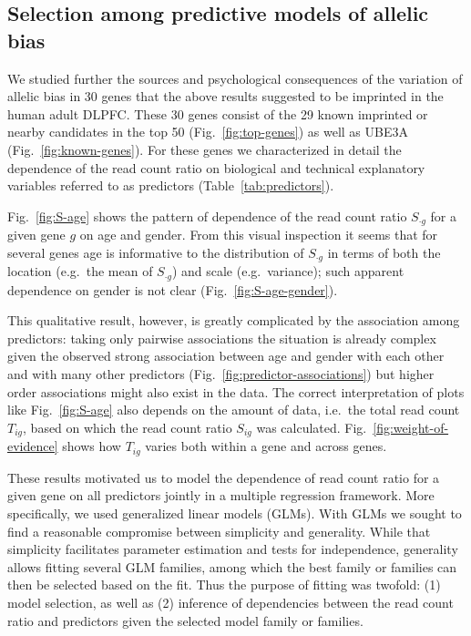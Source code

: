 \documentclass[12pt,letterpaper]{article}
\begin{document}
\subsection{Selection among predictive models of allelic bias}
\label{sec:results-regression}

We studied further the sources and psychological consequences of the variation
of allelic bias in 30 genes that the above results suggested to be imprinted
in the human adult DLPFC.  These 30 genes consist of the 29 known imprinted or
nearby candidates in the top 50 (Fig.~\ref{fig:top-genes}) as well as UBE3A
(Fig.~\ref{fig:known-genes}).  For these genes we characterized in detail the
dependence of the read count ratio on biological and technical explanatory
variables referred to as predictors (Table~\ref{tab:predictors}).

Fig.~\ref{fig:S-age} shows the pattern of dependence of
the read count ratio \(S_{\cdot g}\) for a given gene \(g\) on age and gender.  From
this visual inspection it seems that for several genes age is informative to
the distribution of \(S_{\cdot g}\) in terms of both the location (e.g.~the mean of
\(S_{\cdot g}\)) and scale (e.g.~variance); such apparent dependence on gender is not
clear (Fig.~\ref{fig:S-age-gender}).

This qualitative result, however, is greatly complicated by the association
among predictors: taking only pairwise associations the situation is already
complex given the observed strong association between age and gender with each
other and with many other predictors (Fig.~\ref{fig:predictor-associations})
but higher order associations might also exist in the data.
The correct interpretation of plots like Fig.~\ref{fig:S-age} also depends on
the amount of data, i.e.~the total read count \(T_{ig}\), based on which the
read count ratio \(S_{ig}\) was calculated.  Fig.~\ref{fig:weight-of-evidence}
shows how \(T_{ig}\) varies both within a gene and across genes.

These results motivated us to model the dependence of read count ratio for a
given gene on all predictors jointly in a multiple regression framework.  More
specifically, we used generalized linear models (GLMs).  With GLMs we sought
to find a reasonable compromise between simplicity and generality.  While that
simplicity facilitates parameter estimation and tests for independence,
generality allows fitting several GLM families, among which the best family or
families can then be selected based on the fit.  Thus the purpose of fitting
was twofold: (1) model selection, as well as (2) inference of dependencies
between the read count ratio and predictors given the selected model family or
families.
\end{document}
